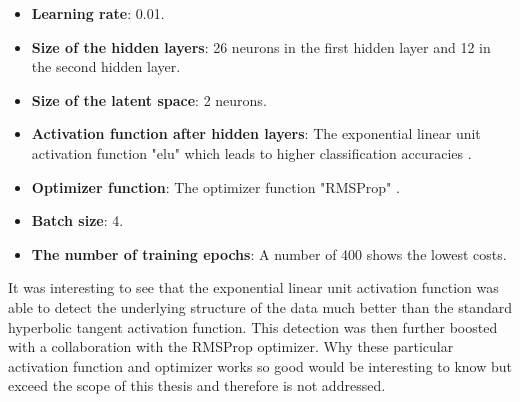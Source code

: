 \documentclass[MGS,Master,english]{twbook}%
\begin{document}
\begin{itemize}
	\item \textbf{Learning rate}: 0.01.
	\item \textbf{Size of the hidden layers}: 26 neurons in the first hidden layer and 12 in the second hidden layer.
	\item \textbf{Size of the latent space}: 2 neurons.
	\item \textbf{Activation function after hidden layers}: The exponential linear unit activation function "elu" which leads to higher classification accuracies \cite{ml::activation::elu}.
	\item \textbf{Optimizer function}: The optimizer function "RMSProp" \cite{ml::optimizer::overview}.
	\item \textbf{Batch size}: 4.
	\item \textbf{The number of training epochs}: A number of 400 shows the lowest costs. 
\end{itemize}
It was interesting to see that the exponential linear unit activation function was able to detect the underlying structure of the data much better than the standard hyperbolic tangent activation function. This detection was then further boosted with a collaboration with the RMSProp optimizer. Why these particular activation function and optimizer works so good would be interesting to know but exceed the scope of this thesis and therefore is not addressed.
\end{document}
